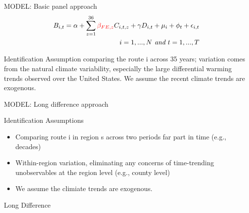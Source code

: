 \documentclass[handout]{beamer}
\begin{document}
\begin{frame}{MODEL: Basic panel approach}
    \begin{equation}
      \begin{aligned}
        B_{i,t}=\alpha + \sum_{z=1}^{36} \textcolor{red}{\beta_{FE, z}} C_{i,t,z} + \gamma D_{i,t} + \mu_i + \phi_t + \epsilon_{i,t} \\ \textit{$i=1,...,N$ and $t=1,...,T$}
        \label{equ:e1}
      \end{aligned}
    \end{equation}
    \begin{block}{Identification Assumption}
    comparing the route i across 35 years; variation comes from the natural climate variability, especially the large differential warming trends observed over the United States. We assume the recent climate trends are exogenous.
   \end{block}
\end{frame}




\begin{frame}{MODEL: Long difference approach}
    \begin{block}{Identification Assumptions}
      \begin{itemize}
        \item Comparing route i in region s across two periods far part in time (e.g., decades)
        \item Within-region variation, eliminating any concerns of time-trending unobservables at the region level (e.g., county level)
        \item We assume the climiate trends are exogenous.
      \end{itemize}
    \end{block}
\end{frame}


\begin{frame}{Long Difference}
\end{frame}
\end{document}

